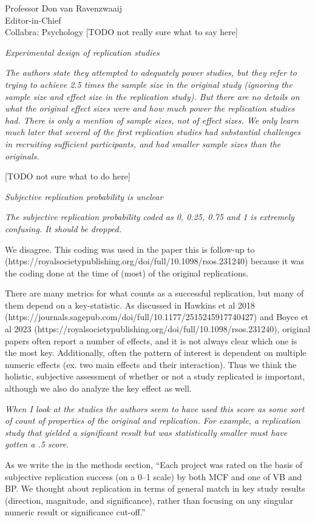 \documentclass{stanfordletter}
\newcommand{\theysaid}[1]{\begin{leftbar} \noindent 
		\textsl{ #1}\end{leftbar}}
\begin{document}
\begin{letter}{Professor Don van Ravenzwaaij \\ Editor-in-Chief \\ Collabra: Psychology }
		[TODO not really sure what to say here]
		
		\theysaid{Experimental design of replication studies}
		\theysaid{The authors state they attempted to adequately power studies, but they refer to trying to achieve 2.5 times the sample size in the original study (ignoring the sample size and effect size in the replication study). But there are no details on what the original effect sizes were and how much power the replication studies had. There is only a mention of sample sizes, not of effect sizes. We only learn much later that several of the first replication studies had substantial challenges in recruiting sufficient participants, and had smaller sample sizes than the originals.}
		
		[TODO not sure what to do here]
		
		\theysaid{Subjective replication probability is unclear}
		\theysaid{The subjective replication probability coded as 0, 0.25, 0.75 and 1 is extremely confusing. It should be dropped.}
		
		We disagree. This coding was used in the paper this is follow-up to (https://royalsocietypublishing.org/doi/full/10.1098/rsos.231240) because it was the coding done at the time of (most) of the original replications. 
		
		There are many metrics for what counts as a successful replication, but many of them depend on a key-statistic. As discussed in Hawkins et al 2018 (https://journals.sagepub.com/doi/full/10.1177/2515245917740427) and Boyce et al 2023 (https://royalsocietypublishing.org/doi/full/10.1098/rsos.231240), original papers often report a number of effects, and it is not always clear which one is the most key. Additionally, often the pattern of interest is dependent on multiple numeric effects (ex. two main effects and their interaction). Thus we think the holistic, subjective assessment of whether or not a study replicated is important, although we also do analyze the key effect as well. 
		
		\theysaid{ When I look at the studies the authors seem to have used this score as some sort of count of properties of the original and replication. For example, a replication study that yielded a significant result but was statistically smaller must have gotten a .5 score. }
		
		As we write the in the methods section, ``Each project was rated on the basis of subjective replication success (on a 0--1 scale) by both MCF and one of VB and BP.
		We thought about replication in terms of general match in key study results (direction, magnitude, and significance), rather than focusing on any singular numeric result or significance cut-off.''
 

\end{letter}
\end{document}
